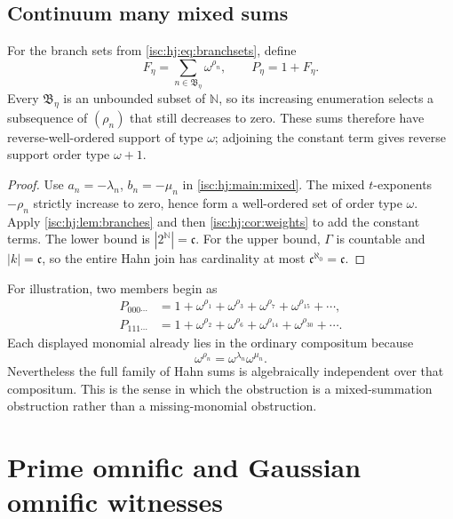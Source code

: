 \documentclass[11pt,letterpaper]{article}
\newtheorem{proposition}[theorem]{Proposition}
\theoremstyle{definition}
\theoremstyle{remark}
\newcommand{\R}{\mathbb R}
\newcommand{\C}{\mathbb C}
\newcommand{\N}{\mathbb N}
\newcommand{\K}[2]{\mathcal K_{#1}(#2)}
\newcommand{\trdeg}{\operatorname{trdeg}}
\newcommand{\cc}{\mathfrak c}
\numberwithin{equation}{section}
\begin{document}
\subsection{Continuum many mixed sums}

For the branch sets from \eqref{isc:hj:eq:branchsets}, define
\[
 F_\eta=\sum_{n\in\mathfrak B_\eta}\omega^{\rho_n},\qquad P_\eta=1+F_\eta.
\]
Every $\mathfrak B_\eta$ is an unbounded subset of $\N$, so its increasing
enumeration selects a subsequence of $(\rho_n)$ that still decreases to
zero. These sums therefore have reverse-well-ordered support of type
$\omega$; adjoining the constant term gives reverse support order type
$\omega+1$.

\begin{proof}
Use $a_n=-\lambda_n$, $b_n=-\mu_n$ in \cref{isc:hj:main:mixed}.
The mixed $t$-exponents $-\rho_n$ strictly increase to zero, hence form
a well-ordered set of order type $\omega$. Apply \cref{isc:hj:lem:branches}
and then \cref{isc:hj:cor:weights} to add the constant terms.
The lower bound is $|2^{\N}|=\cc$. For the upper bound, $\Gamma$
is countable and $|k|=\cc$, so the entire Hahn join has cardinality
at most $\cc^{\aleph_0}=\cc$.
\end{proof}

For illustration, two members begin as
\[
 \begin{aligned}
 P_{000\cdots}&=1+\omega^{\rho_1}+\omega^{\rho_3}
                         +\omega^{\rho_7}+\omega^{\rho_{15}}+\cdots,\\
 P_{111\cdots}&=1+\omega^{\rho_2}+\omega^{\rho_6}
                         +\omega^{\rho_{14}}+\omega^{\rho_{30}}+\cdots.
 \end{aligned}
\]
Each displayed monomial already lies in the ordinary compositum because
\[
 \omega^{\rho_n}=\omega^{\lambda_n}\omega^{\mu_n}.
\]
Nevertheless the full family of Hahn sums is algebraically independent
over that compositum. This is the sense in which the obstruction is a
mixed-summation obstruction rather than a missing-monomial obstruction.

\section{Prime omnific and Gaussian omnific witnesses}\label{isc:hj:sec:prime}
\end{document}
